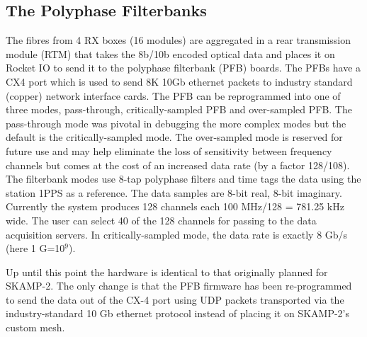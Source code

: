\subsection{The Polyphase Filterbanks}
The fibres from 4 RX boxes (16 modules) are aggregated in a rear transmission module (RTM) that takes the 8b/10b encoded optical data and places it on Rocket IO to send it to the polyphase filterbank (PFB) boards. The PFBs have a CX4 port which is used to send 8K 10Gb ethernet packets to industry standard (copper) network interface cards. The PFB can be reprogrammed into one of three modes, pass-through, critically-sampled PFB and over-sampled PFB. The pass-through mode was pivotal in debugging the more complex modes but the default is the critically-sampled mode. The over-sampled mode is reserved for future use and may help eliminate the loss of sensitivity between frequency channels but comes at the cost of an increased data rate (by a factor 128/108). The filterbank modes use 8-tap polyphase filters and time tags the data using the station 1PPS as a reference. The data samples are 8-bit real, 8-bit imaginary. Currently the system produces 128 channels each 100 MHz/128 = 781.25 kHz wide. The user can select 40 of the 128 channels for passing to the data acquisition servers. In critically-sampled mode, the data rate is exactly 8 Gb/s (here 1 G=10$^9$).

Up until this point the hardware is identical to that originally planned for SKAMP-2. The only change is that the PFB firmware has been re-programmed to send the data out of the CX-4 port using UDP packets transported via the industry-standard 10 Gb ethernet protocol instead of placing it on SKAMP-2's custom mesh.

